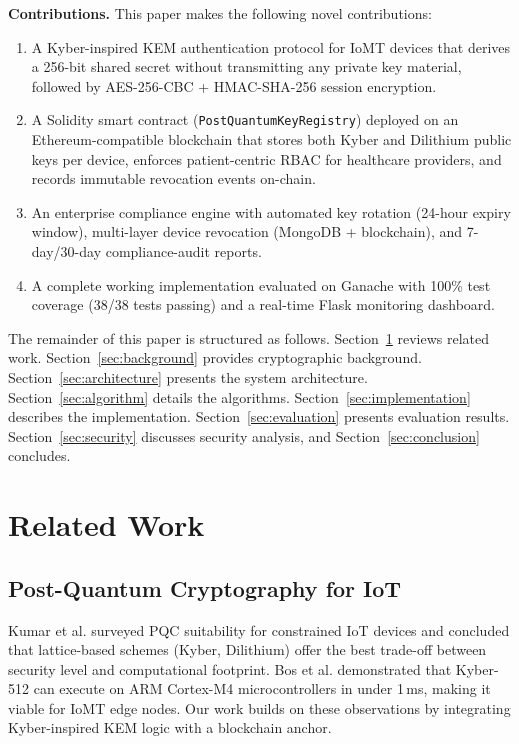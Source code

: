 \documentclass[conference]{IEEEtran}
\begin{document}
\textbf{Contributions.} This paper makes the following novel contributions:
\begin{enumerate}
  \item A Kyber-inspired KEM authentication protocol for IoMT devices that derives
        a 256-bit shared secret without transmitting any private key material, followed
        by AES-256-CBC + HMAC-SHA-256 session encryption.
  \item A Solidity smart contract (\texttt{PostQuantumKeyRegistry}) deployed on an
        Ethereum-compatible blockchain that stores both Kyber and Dilithium public keys
        per device, enforces patient-centric RBAC for healthcare providers, and records
        immutable revocation events on-chain.
  \item An enterprise compliance engine with automated key rotation (24-hour expiry
        window), multi-layer device revocation (MongoDB + blockchain), and 7-day/30-day
        compliance-audit reports.
  \item A complete working implementation evaluated on Ganache with 100\% test coverage
        (38/38 tests passing) and a real-time Flask monitoring dashboard.
\end{enumerate}

The remainder of this paper is structured as follows. Section~\ref{sec:related}
reviews related work. Section~\ref{sec:background} provides cryptographic background.
Section~\ref{sec:architecture} presents the system architecture.
Section~\ref{sec:algorithm} details the algorithms. Section~\ref{sec:implementation}
describes the implementation. Section~\ref{sec:evaluation} presents evaluation results.
Section~\ref{sec:security} discusses security analysis, and Section~\ref{sec:conclusion}
concludes.

\section{Related Work}
\label{sec:related}

\subsection{Post-Quantum Cryptography for IoT}
Kumar et al. \cite{pq_iot_auth} surveyed PQC suitability for constrained IoT devices
and concluded that lattice-based schemes (Kyber, Dilithium) offer the best trade-off
between security level and computational footprint. Bos et al. \cite{kyber_iot}
demonstrated that Kyber-512 can execute on ARM Cortex-M4 microcontrollers in under
1\,ms, making it viable for IoMT edge nodes. Our work builds on these observations by
integrating Kyber-inspired KEM logic with a blockchain anchor.
\end{document}
